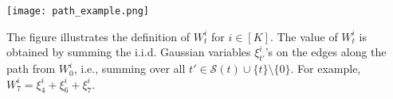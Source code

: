 \documentclass[12pt]{article}
\begin{document}
\begin{center}
\texttt{[image: path\_example.png]}
\end{center}

The figure illustrates the definition of $W_t^i$ for $i\in[K]$. The value of $W_t^i$ is obtained by summing the i.i.d. Gaussian variables $\xi_{t'}^i$'s on the edges along the path from $W_0^i$, i.e., summing over all $t'\in \mathcal{S}(t) \cup \{t\} \setminus \{0\}$. For example, $W_7^i = \xi_4^i + \xi_6^i + \xi_7^i$.
\end{document}

